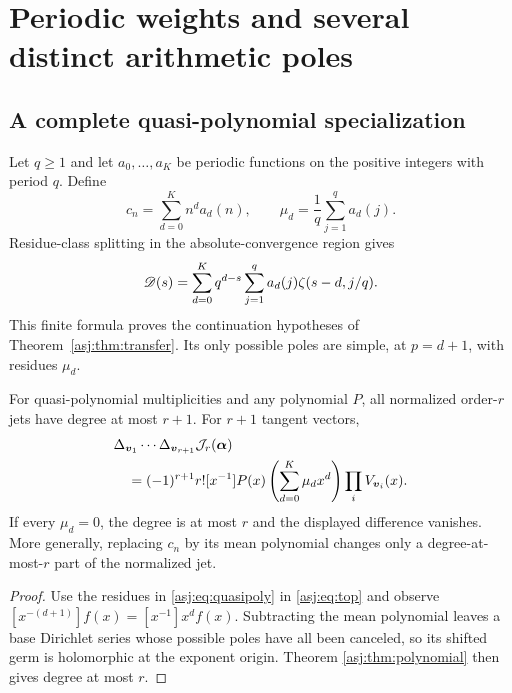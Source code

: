 \section{Periodic weights and several distinct arithmetic poles}
\label{asj:sec:arithmetic}

\subsection{A complete quasi-polynomial specialization}
Let $q\ge1$ and let $a_0,\ldots,a_K$ be periodic functions on the positive
integers with period $q$. Define
\[
 c_n=\sum_{d=0}^K n^d a_d(n),\qquad
 \mu_d=\frac1q\sum_{j=1}^q a_d(j).
\]
Residue-class splitting in the absolute-convergence region gives
\begin{equation}\label{asj:eq:quasipoly}
 \mathscr D(s)=\sum_{d=0}^K q^{d-s}
                  \sum_{j=1}^q a_d(j)\zeta(s-d,j/q).
\end{equation}
This finite formula proves the continuation hypotheses of
Theorem~\ref{asj:thm:transfer}. Its only possible poles are simple, at $p=d+1$,
with residues $\mu_d$.

\begin{corollary}
\label{asj:thm:mean}
For quasi-polynomial multiplicities and any polynomial $P$, all normalized
order-$r$ jets have degree at most $r+1$. For $r+1$ tangent vectors,
\begin{align}\label{asj:eq:mean}
 &\Delta_{\boldsymbol v_1}\cdots\Delta_{\boldsymbol v_{r+1}}
       \mathcal J_r(\boldsymbol\alpha)\notag\\
 &\quad=(-1)^{r+1}r![x^{-1}]P(x)
           \left(\sum_{d=0}^K\mu_dx^d\right)
                       \prod_i V_{\boldsymbol v_i}(x).
\end{align}
If every $\mu_d=0$, the degree is at most $r$ and the displayed difference
vanishes. More generally, replacing $c_n$ by its mean polynomial changes
only a degree-at-most-$r$ part of the normalized jet.
\end{corollary}
\begin{proof}
Use the residues in \eqref{asj:eq:quasipoly} in \eqref{asj:eq:top} and observe
$[x^{-(d+1)}]f(x)=[x^{-1}]x^d f(x)$. Subtracting the mean polynomial
leaves a base Dirichlet series whose possible poles have all been canceled,
so its shifted germ is holomorphic at the exponent origin. Theorem
\ref{asj:thm:polynomial} then gives degree at most $r$.
\end{proof}

